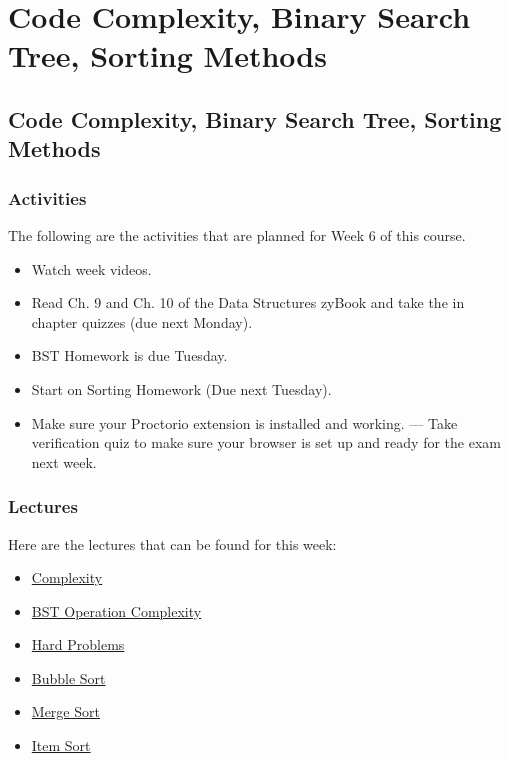 \clearpage

\renewcommand{\ChapTitle}{Code Complexity, Binary Search Tree, Sorting Methods}

\chapter{\ChapTitle}
\section{\ChapTitle}

\subsection{Activities}

The following are the activities that are planned for Week 6 of this course.

\begin{itemize}
    \item Watch week videos.
    \item Read Ch. 9 and Ch. 10 of the Data Structures zyBook and take the in chapter quizzes (due next Monday).
    \item BST Homework is due Tuesday.
    \item Start on Sorting Homework (Due next Tuesday).
    \item Make sure your Proctorio extension is installed and working. --- Take verification quiz to make sure your browser is set up and ready for the exam next week.
\end{itemize}

\subsection{Lectures}

Here are the lectures that can be found for this week:

\begin{itemize}
    \item \href{https://applied.cs.colorado.edu/mod/hvp/view.php?id=45942}{Complexity}
    \item \href{https://applied.cs.colorado.edu/mod/hvp/view.php?id=45943}{BST Operation Complexity}
    \item \href{https://applied.cs.colorado.edu/mod/hvp/view.php?id=45944}{Hard Problems}
    \item \href{https://applied.cs.colorado.edu/mod/hvp/view.php?id=45945}{Bubble Sort}
    \item \href{https://applied.cs.colorado.edu/mod/hvp/view.php?id=45946}{Merge Sort}
    \item \href{https://applied.cs.colorado.edu/mod/hvp/view.php?id=45947}{Item Sort}
\end{itemize}


